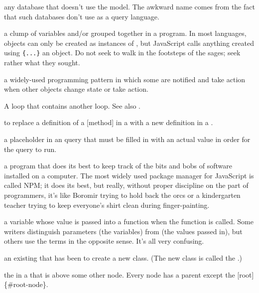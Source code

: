 \begin{description}
any database that doesn't use the  model.
The awkward name comes from the fact that such databases don't use
 as a query language.

a clump of variables and/or  grouped together in a
program. In most languages, objects can only be created as instances of
, but JavaScript calls anything created using \texttt{\{...\}} an
object. Do not seek to walk in the footsteps of the sages; seek rather what
they sought.

a widely-used programming pattern in which some  are
notified and take action when other objects change state or take action.

A loop that contains another loop.
See also .

to replace a definition of a [method] in a 
with a new definition in a .

a placeholder in an  query that must be filled in with an actual
value in order for the query to run.

a program that does its best to keep track of the bits and bobs of software
installed on a computer. The most widely used package manager for JavaScript
is called NPM; it does its best, but really, without proper discipline on the
part of programmers, it's like Boromir trying to hold back the orcs or a
kindergarten teacher trying to keep everyone's shirt clean during
finger-painting.

a variable whose value is passed into a function when the function is called.
Some writers distinguish parameters (the variables) from
 (the values passed in), but others use the terms in
the opposite sense. It's all very confusing.

an existing  that has been  to create a
new class. (The new class is called the .)

the  in a  that is above some other node. Every
node has a parent except the [root]\{\#root-node\}.


\end{description}
